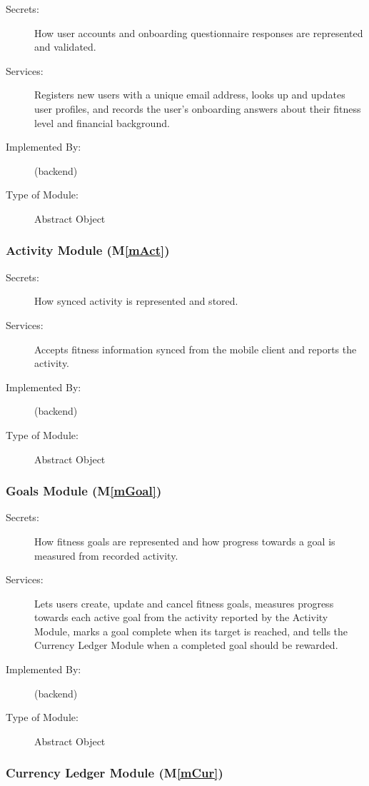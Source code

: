 \documentclass[12pt, titlepage]{article}
\newcommand{\mref}[1]{M\ref{#1}}
\begin{document}
\begin{description}
\item[Secrets:] How user accounts and onboarding questionnaire responses are
  represented and validated.
\item[Services:] Registers new users with a unique email address, looks up and
  updates user profiles, and records the user's onboarding answers about their
  fitness level and financial background.
\item[Implemented By:] \progname{} (backend)
\item[Type of Module:] Abstract Object
\end{description}

\subsubsection{Activity Module (\mref{mAct})}

\begin{description}
\item[Secrets:] How synced activity is represented and stored.
\item[Services:] Accepts fitness information synced from the mobile
client and reports the activity.  
\item[Implemented By:] \progname{} (backend)
\item[Type of Module:] Abstract Object
\end{description}

\subsubsection{Goals Module (\mref{mGoal})}

\begin{description}
\item[Secrets:] How fitness goals are represented and how progress towards a
  goal is measured from recorded activity.
\item[Services:] Lets users create, update and cancel fitness goals, measures
  progress towards each active goal from the activity reported by the Activity
  Module, marks a goal complete when its target is reached, and tells the
  Currency Ledger Module when a completed goal should be rewarded.
\item[Implemented By:] \progname{} (backend)
\item[Type of Module:] Abstract Object
\end{description}

\subsubsection{Currency Ledger Module (\mref{mCur})}
\end{document}
